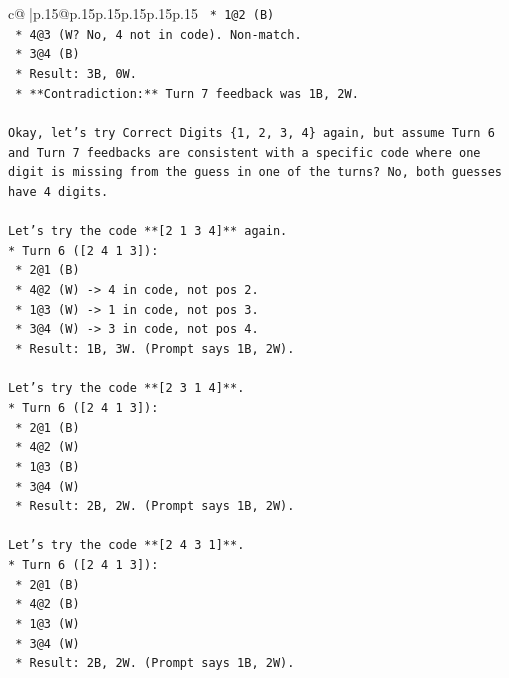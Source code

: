 \documentclass{article}
\begin{document}
{\begin{supertabular}{c@{$\;$}|p{.15\linewidth}@{}p{.15\linewidth}p{.15\linewidth}p{.15\linewidth}p{.15\linewidth}p{.15\linewidth}}
{{{\texttt{    *   1@2 (B)} \\
\texttt{    *   4@3 (W? No, 4 not in code). Non{-}match.} \\
\texttt{    *   3@4 (B)} \\
\texttt{    *   Result: 3B, 0W.} \\
\texttt{    *   **Contradiction:** Turn 7 feedback was 1B, 2W.} \\
\\ 
\texttt{Okay, let's try Correct Digits \{1, 2, 3, 4\} again, but assume Turn 6 and Turn 7 feedbacks are consistent with a specific code where one digit is missing from the guess in one of the turns? No, both guesses have 4 digits.} \\
\\ 
\texttt{Let's try the code **{[}2 1 3 4{]}** again.} \\
\texttt{*   Turn 6 ({[}2 4 1 3{]}):} \\
\texttt{    *   2@1 (B)} \\
\texttt{    *   4@2 (W) {-}> 4 in code, not pos 2.} \\
\texttt{    *   1@3 (W) {-}> 1 in code, not pos 3.} \\
\texttt{    *   3@4 (W) {-}> 3 in code, not pos 4.} \\
\texttt{    *   Result: 1B, 3W. (Prompt says 1B, 2W).} \\
\\ 
\texttt{Let's try the code **{[}2 3 1 4{]}**.} \\
\texttt{*   Turn 6 ({[}2 4 1 3{]}):} \\
\texttt{    *   2@1 (B)} \\
\texttt{    *   4@2 (W)} \\
\texttt{    *   1@3 (B)} \\
\texttt{    *   3@4 (W)} \\
\texttt{    *   Result: 2B, 2W. (Prompt says 1B, 2W).} \\
\\ 
\texttt{Let's try the code **{[}2 4 3 1{]}**.} \\
\texttt{*   Turn 6 ({[}2 4 1 3{]}):} \\
\texttt{    *   2@1 (B)} \\
\texttt{    *   4@2 (B)} \\
\texttt{    *   1@3 (W)} \\
\texttt{    *   3@4 (W)} \\
\texttt{    *   Result: 2B, 2W. (Prompt says 1B, 2W).} \\
\\ 
}}}
\end{supertabular}}
\end{document}
